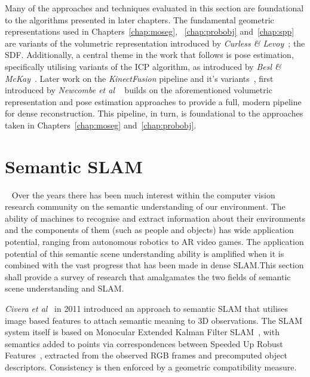 Many of the approaches and techniques evaluated in this section are foundational to the algorithms 
presented in later chapters. The fundamental geometric representations used in Chapters~\ref{chap:moseg},
~\ref{chap:probobj} and~\ref{chap:spp} are variants of the volumetric representation introduced by 
\textit{Curless \& Levoy}~\cite{Curless1996}; the SDF\@. Additionally, a central theme 
in the work that follows is pose estimation, specifically utilising variants of the ICP algorithm, as 
introduced by \textit{Besl \& McKay}~\cite{Besl1992}. Later work on the \textit{KinectFusion} 
pipeline and it's variants~\cite{Prisacariu2014,NieBner2013}, first introduced by \textit{Newcombe et al}
~\cite{Newcombe2011} builds on the aforementioned volumetric representation and pose estimation approaches to 
provide a full, modern pipeline for dense reconstruction. This pipeline, in turn, is foundational to the 
approaches taken in Chapters~\ref{chap:moseg} and~\ref{chap:probobj}.

\section{Semantic SLAM}
~\label{sec:lit_review_semantic}
Over the years there has been much interest within the computer vision research community on 
the semantic understanding of our environment. The ability of machines to recognise and extract 
information about their environments and the components of them (such as people and objects) has 
wide application potential, ranging from autonomous robotics to AR video games. 
The application potential of this semantic scene understanding ability is amplified when it is 
combined with the vast progress that has been made in dense SLAM.\@ This section shall provide a 
survey of research that amalgamates the two fields of semantic scene understanding and SLAM.\@

\textit{Civera et al}~\cite{Civera2011} in 2011 introduced an approach to semantic SLAM 
that utilises image based features to attach semantic meaning to 3D observations. The SLAM 
system itself is based on Monocular Extended Kalman Filter SLAM~\cite{Smith1990}, with 
semantics added to points via correspondences between Speeded Up Robust Features~\cite{Bay2006}, 
extracted from the observed RGB frames and precomputed object descriptors. Consistency 
is then enforced by a geometric compatibility measure.

